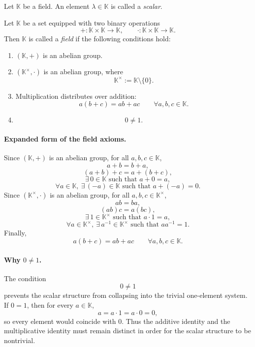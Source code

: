 \documentclass{article}
\begin{document}
\begin{definition}[Scalar]
Let $\mathbb{K}$ be a field. An element $\lambda\in\mathbb{K}$ is called a \emph{scalar}.
\end{definition}

\begin{definition}[Field]
Let $\mathbb{K}$ be a set equipped with two binary operations
$$
+:\mathbb{K}\times\mathbb{K}\to\mathbb{K},
\qquad
\cdot:\mathbb{K}\times\mathbb{K}\to\mathbb{K}.
$$
Then $\mathbb{K}$ is called a \emph{field} if the following conditions hold:
\begin{enumerate}
    \item $(\mathbb{K},+)$ is an abelian group.
    \item $(\mathbb{K}^{\times},\cdot)$ is an abelian group, where
    $$
    \mathbb{K}^{\times}:=\mathbb{K}\setminus\{0\}.
    $$
    \item Multiplication distributes over addition:
    $$
    a(b+c)=ab+ac
    \qquad
    \forall a,b,c\in\mathbb{K}.
    $$
    \item
    $$
    0\neq 1.
    $$
\end{enumerate}
\end{definition}

\paragraph{Expanded form of the field axioms.}
Since $(\mathbb{K},+)$ is an abelian group, for all $a,b,c\in\mathbb{K}$,
$$
a+b=b+a,
$$
$$
(a+b)+c=a+(b+c),
$$
$$
\exists\,0\in\mathbb{K}\text{ such that }a+0=a,
$$
$$
\forall a\in\mathbb{K},\ \exists\,(-a)\in\mathbb{K}\text{ such that }a+(-a)=0.
$$
Since $(\mathbb{K}^{\times},\cdot)$ is an abelian group, for all $a,b,c\in\mathbb{K}^{\times}$,
$$
ab=ba,
$$
$$
(ab)c=a(bc),
$$
$$
\exists\,1\in\mathbb{K}^{\times}\text{ such that }a\cdot 1=a,
$$
$$
\forall a\in\mathbb{K}^{\times},\ \exists\,a^{-1}\in\mathbb{K}^{\times}\text{ such that }aa^{-1}=1.
$$
Finally,
$$
a(b+c)=ab+ac
\qquad
\forall a,b,c\in\mathbb{K}.
$$

\paragraph{Why $0\neq 1$.}
The condition
$$
0\neq 1
$$
prevents the scalar structure from collapsing into the trivial one-element system. If $0=1$, then for every $a\in\mathbb{K}$,
$$
a=a\cdot 1=a\cdot 0=0,
$$
so every element would coincide with $0$. Thus the additive identity and the multiplicative identity must remain distinct in order for the scalar structure to be nontrivial.
\end{document}
